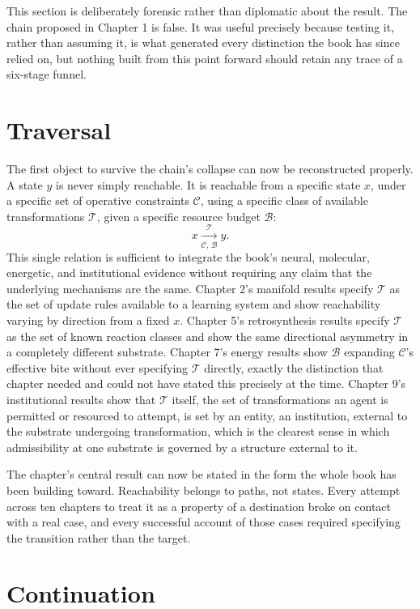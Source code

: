 \documentclass[11pt]{book}
\begin{document}
This section is deliberately forensic rather than diplomatic about the result. The chain proposed in Chapter 1 is false. It was useful precisely because testing it, rather than assuming it, is what generated every distinction the book has since relied on, but nothing built from this point forward should retain any trace of a six-stage funnel.

\section{Traversal}

The first object to survive the chain's collapse can now be reconstructed properly. A state \(y\) is never simply reachable. It is reachable from a specific state \(x\), under a specific set of operative constraints \(\mathcal{C}\), using a specific class of available transformations \(\mathcal{T}\), given a specific resource budget \(\mathcal{B}\):
\[
x \xrightarrow[\mathcal{C},\,\mathcal{B}]{\mathcal{T}} y.
\]
This single relation is sufficient to integrate the book's neural, molecular, energetic, and institutional evidence without requiring any claim that the underlying mechanisms are the same. Chapter 2's manifold results specify \(\mathcal{T}\) as the set of update rules available to a learning system and show reachability varying by direction from a fixed \(x\). Chapter 5's retrosynthesis results specify \(\mathcal{T}\) as the set of known reaction classes and show the same directional asymmetry in a completely different substrate. Chapter 7's energy results show \(\mathcal{B}\) expanding \(\mathcal{C}\)'s effective bite without ever specifying \(\mathcal{T}\) directly, exactly the distinction that chapter needed and could not have stated this precisely at the time. Chapter 9's institutional results show that \(\mathcal{T}\) itself, the set of transformations an agent is permitted or resourced to attempt, is set by an entity, an institution, external to the substrate undergoing transformation, which is the clearest sense in which admissibility at one substrate is governed by a structure external to it.

The chapter's central result can now be stated in the form the whole book has been building toward. Reachability belongs to paths, not states. Every attempt across ten chapters to treat it as a property of a destination broke on contact with a real case, and every successful account of those cases required specifying the transition rather than the target.

\section{Continuation}
\end{document}
